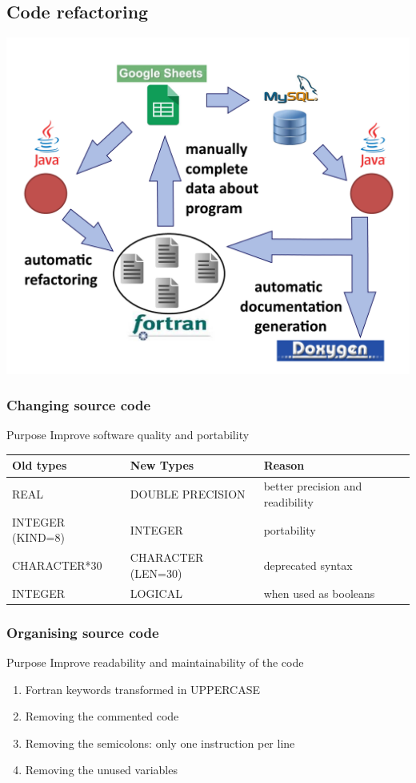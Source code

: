 \documentclass[10p]{beamer}
\newenvironment{changemargin}[2]{%
\begin{list}{}{%
\setlength{\topsep}{0pt}%
\setlength{\leftmargin}{#1}%
\setlength{\rightmargin}{#2}%
\setlength{\listparindent}{\parindent}%
\setlength{\itemindent}{\parindent}%
\setlength{\parsep}{\parskip}%
}%
\item[]}{\end{list}}
\begin{document}
\subsection{Code refactoring}
\begin{frame}
\includegraphics[scale=0.30]{Image/process.png}
\end{frame}
\begin{frame}
\frametitle{Changing source code}
\begin{block}{Purpose}
Improve software quality and portability
\end{block}
\small
\begin{changemargin}{-0.5cm}{0cm}
\begin{tabular}{|l|l|p{100 pt}|}
\hline
\textbf{Old types} & \textbf{New Types} & \textbf{Reason}
\\
\hline
REAL & DOUBLE PRECISION & better precision and readibility
\\
\hline
INTEGER (KIND=8) & INTEGER & portability
\\
\hline
CHARACTER*30 & CHARACTER (LEN=30) & deprecated syntax
\\
\hline
INTEGER & LOGICAL & when used as booleans
\\
\hline
\end{tabular}
\end{changemargin}
\end{frame}

\begin{frame}
\frametitle{Organising source code}
\begin{block}{Purpose}
Improve readability and maintainability of the code
\end{block}
\begin{enumerate}
\item Fortran keywords transformed in UPPERCASE
\item Removing the commented code
\item Removing the semicolons: only one instruction per line
\item Removing the unused variables
\end{enumerate}
\end{frame}
\end{document}
